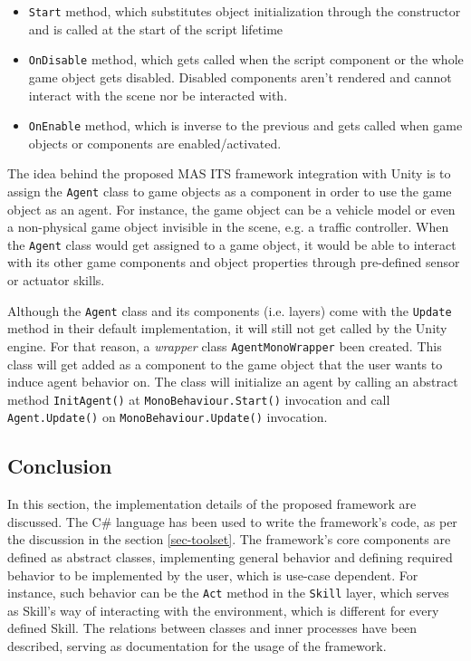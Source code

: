 \documentclass[0main.tex]{subfiles}
\begin{document}
\begin{itemize}
    \item \texttt{Start} method, which substitutes object initialization 
through the constructor and is called at the start of the script lifetime
    \item \texttt{OnDisable} method, which gets called when the script component or the whole game object 
    gets disabled. Disabled components aren't rendered and cannot interact with the scene nor be interacted 
    with. 
    \item \texttt{OnEnable} method, which is inverse to the previous and gets called when game objects 
    or components are enabled/activated.
\end{itemize}

The idea behind the proposed MAS ITS framework integration with Unity is to assign the \texttt{Agent} 
class to game objects as a component in order to use the game object as an agent. For instance, the game object can be 
a vehicle model or even a non-physical game object invisible in the scene, e.g. a traffic controller. When 
the \texttt{Agent} class would get assigned to a game object, it would be able to interact with its other game
components and object properties through pre-defined sensor or actuator skills. 

Although the \texttt{Agent} class and its components (i.e. layers) come with the \texttt{Update} method in 
their default implementation, it will still not get called by the Unity engine. For that reason, a \emph{wrapper}
class \texttt{AgentMonoWrapper} been created. This class will get added as a component to the game object that 
the user wants to induce agent behavior on. The class will initialize an agent by calling an abstract method 
\texttt{InitAgent()} at \texttt{MonoBehaviour.Start()} invocation and call \texttt{Agent.Update()} on 
\texttt{MonoBehaviour.Update()} invocation. 

\subsection{Conclusion}

In this section, the implementation details of the proposed framework are discussed. The C\# language has been 
used to write the framework's code, as per the discussion in the section \ref{sec-toolset}. The framework's core 
components are defined as abstract classes, implementing general behavior and defining required behavior to 
be implemented by the user, which is use-case dependent. For instance, such behavior can be the \texttt{Act}
method in the \texttt{Skill} layer, which serves as Skill's way of interacting with the environment, which is 
different for every defined Skill. The relations between classes and inner processes have been described, serving 
as documentation for the usage of the framework. 
\end{document}
